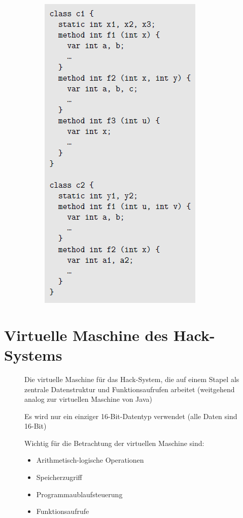 \documentclass[12pt]{report}
\begin{document}
\begin{figure}[H]
\begin{minipage}[t]{0.45\textwidth}
\begin{figure}[H]
      \includegraphics{jack_quelltext}
    \end{figure}
  \end{minipage}
\end{figure}



\section{Virtuelle Maschine des Hack-Systems}
\begin{figure}[H]
  \begin{minipage}[t]{0.45\textwidth}
    Die virtuelle Maschine für das Hack-System, die auf einem Stapel als zentrale Datenstruktur
    und Funktionsaufrufen arbeitet (weitgehend analog zur virtuellen Maschine von Java)
    
    Es wird nur ein einziger 16-Bit-Datentyp verwendet (alle Daten sind 16-Bit)
  \end{minipage}
  \hfill
  \begin{minipage}[t]{0.45\textwidth}
    Wichtig für die Betrachtung der virtuellen Maschine sind:
    \begin{itemize}
      \item Arithmetisch-logische Operationen
      \item Speicherzugriff
      \item Programmaublaufsteuerung
      \item Funktionsaufrufe
    \end{itemize}
  \end{minipage}
\end{figure}
\end{document}
